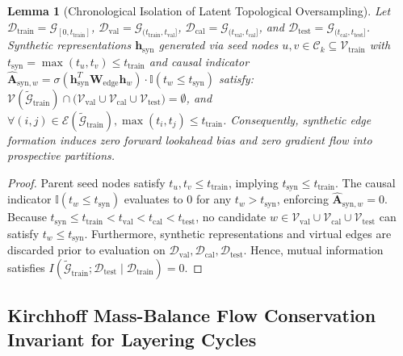 \documentclass[a4paper,fleqn,twocolumn]{article}
\newtheorem{lemma}{Lemma}
\begin{document}
\begin{lemma}[Chronological Isolation of Latent Topological Oversampling]
\label{lem:graphsmote_causality}
Let $\mathcal{D}_{\text{train}} = \mathcal{G}_{[0, t_{\text{train}}]}$, $\mathcal{D}_{\text{val}} = \mathcal{G}_{(t_{\text{train}}, t_{\text{val}}]}$, $\mathcal{D}_{\text{cal}} = \mathcal{G}_{(t_{\text{val}}, t_{\text{cal}}]}$, and $\mathcal{D}_{\text{test}} = \mathcal{G}_{(t_{\text{cal}}, t_{\text{test}}]}$. Synthetic representations $\mathbf{h}_{\text{syn}}$ generated via seed nodes $u, v \in \mathcal{C}_k \subseteq \mathcal{V}_{\text{train}}$ with $t_{\text{syn}} = \max(t_u, t_v) \le t_{\text{train}}$ and causal indicator $\hat{\mathbf{A}}_{\text{syn}, w} = \sigma(\mathbf{h}_{\text{syn}}^T \mathbf{W}_{\text{edge}} \mathbf{h}_w) \cdot \mathbb{I}(t_w \le t_{\text{syn}})$ satisfy:
$\mathcal{V}(\tilde{\mathcal{G}}_{\text{train}}) \cap \big(\mathcal{V}_{\text{val}} \cup \mathcal{V}_{\text{cal}} \cup \mathcal{V}_{\text{test}}\big) = \emptyset$, and $\forall (i, j) \in \mathcal{E}(\tilde{\mathcal{G}}_{\text{train}}), \max(t_i, t_j) \le t_{\text{train}}$. Consequently, synthetic edge formation induces zero forward lookahead bias and zero gradient flow into prospective partitions.
\end{lemma}
\begin{proof}
Parent seed nodes satisfy $t_u, t_v \le t_{\text{train}}$, implying $t_{\text{syn}} \le t_{\text{train}}$. The causal indicator $\mathbb{I}(t_w \le t_{\text{syn}})$ evaluates to 0 for any $t_w > t_{\text{syn}}$, enforcing $\hat{\mathbf{A}}_{\text{syn}, w} = 0$. Because $t_{\text{syn}} \le t_{\text{train}} < t_{\text{val}} < t_{\text{cal}} < t_{\text{test}}$, no candidate $w \in \mathcal{V}_{\text{val}} \cup \mathcal{V}_{\text{cal}} \cup \mathcal{V}_{\text{test}}$ can satisfy $t_w \le t_{\text{syn}}$. Furthermore, synthetic representations and virtual edges are discarded prior to evaluation on $\mathcal{D}_{\text{val}}, \mathcal{D}_{\text{cal}}, \mathcal{D}_{\text{test}}$. Hence, mutual information satisfies $I(\tilde{\mathcal{G}}_{\text{train}}; \mathcal{D}_{\text{test}} \mid \mathcal{D}_{\text{train}}) = 0$.
\end{proof}

\subsection{Kirchhoff Mass-Balance Flow Conservation Invariant for Layering Cycles}
\end{document}
